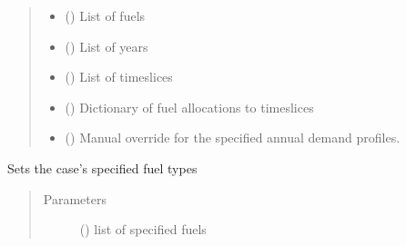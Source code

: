 \documentclass[a4paper,12pt,english]{article}
\begin{document}
\begin{fulllineitems}
\begin{fulllineitems}
\begin{quote}
\begin{description}
\begin{itemize}
\item {} 
 () \textendash{} List of fuels

\item {} 
 () \textendash{} List of years

\item {} 
 () \textendash{} List of timeslices

\item {} 
 () \textendash{} Dictionary of fuel allocations to timeslices

\item {} 
 (\sphinxstyleliteralemphasis{\sphinxupquote{, }}) \textendash{} Manual override for the specified annual demand profiles.

\end{itemize}

\end{description}\end{quote}

\end{fulllineitems}


\begin{fulllineitems}
\label{\detokenize{GOCPI:GOCPI.CreateCases.CreateCases.set_specified_fuel}}
Sets the case’s specified fuel types
\begin{quote}\begin{description}
\item[{Parameters}] \leavevmode
{} () \textendash{} list of specified fuels

\end{description}\end{quote}


\end{fulllineitems}
\end{fulllineitems}
\end{document}
